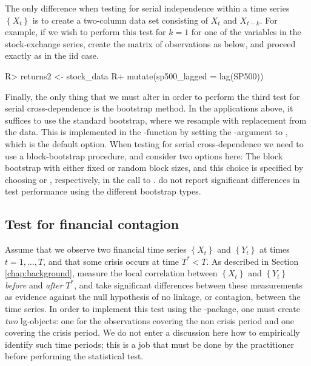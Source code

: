 The only difference when testing for serial independence within a time series \(\left\{X_t\right\}\) is to create a two-column data set consisting of
\(X_t\) and \(X_{t-k}\). For example, if we wish to perform this test for \(k=1\) for one of the variables in the stock-exchange series,
create the matrix of observations as below, and proceed exactly as in the iid case.

\begin{example}
R> returns2 <- stock_data %
R+   mutate(sp500_lagged = lag(SP500))
\end{example}

Finally, the only thing that we must alter in order to perform the third test for serial cross-dependence is the bootstrap method. In the applications above, it suffices to use the standard bootstrap, where we resample with replacement from the data. This is implemented in the -function by setting the -argument to , which is the default option. When testing for serial cross-dependence we need to use a block-bootstrap procedure, and \cite{laca:tjos:2018} consider two options here: The block bootstrap with either fixed \citep{kuns:1989} or random \citep{poli:roma:1994} block sizes, and this choice is specified by choosing  or , respectively, in the call to . \cite{laca:tjos:2018} do not report significant differences in test performance using the different bootstrap types.

\subsection{Test for financial contagion}\label{chap:cont}

Assume that we observe two financial time series \(\left\{X_t\right\}\) and \(\left\{Y_t\right\}\) at times \(t = 1,\ldots,T\), and that some crisis occurs at time \(T^* < T\). As described in Section \ref{chap:background}, \cite{stov:tjos:huft:2014} measure the local correlation between \(\left\{X_t\right\}\) and \(\left\{Y_t\right\}\) \emph{before} and \emph{after} \(T^*\), and take significant differences between these measurements as evidence against the null hypothesis of no linkage, or contagion, between the time series. In order to implement this test using the -package, one must create \emph{two} lg-objects: one for the observations covering the non crisis period and one covering the crisis period. We do not enter a discussion here how to empirically identify such time periods; this is a job that must be done by the practitioner before performing the statistical test.

